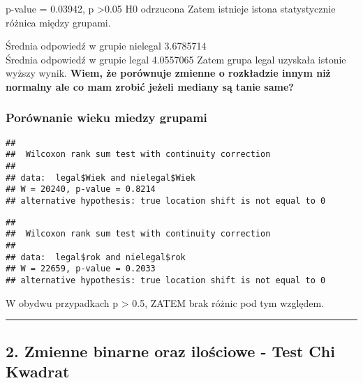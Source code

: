 \documentclass[]{article}
\newenvironment{Shaded}{\begin{snugshade}}{\end{snugshade}}
\newcommand{\KeywordTok}[1]{\textcolor[rgb]{0.13,0.29,0.53}{\textbf{#1}}}
\newcommand{\OperatorTok}[1]{\textcolor[rgb]{0.81,0.36,0.00}{\textbf{#1}}}
\newcommand{\NormalTok}[1]{#1}
\begin{document}
p-value = 0.03942, p \textgreater{}0.05 H0 odrzucona Zatem istnieje
istona statystycznie różnica między grupami.

Średnia odpowiedź w grupie nielegal 3.6785714\\
Średnia odpowiedź w grupie legal 4.0557065 Zatem grupa legal uzyskała
istonie wyższy wynik. \textbf{Wiem, że porównuje zmienne o rozkładzie
innym niż normalny ale co mam zrobić jeżeli mediany są tanie same?}

\subsubsection{Porównanie wieku miedzy
grupami}\label{porownanie-wieku-miedzy-grupami}

\begin{Shaded}
\end{Shaded}

\begin{verbatim}
## 
##  Wilcoxon rank sum test with continuity correction
## 
## data:  legal$Wiek and nielegal$Wiek
## W = 20240, p-value = 0.8214
## alternative hypothesis: true location shift is not equal to 0
\end{verbatim}

\begin{Shaded}
\end{Shaded}

\begin{verbatim}
## 
##  Wilcoxon rank sum test with continuity correction
## 
## data:  legal$rok and nielegal$rok
## W = 22659, p-value = 0.2033
## alternative hypothesis: true location shift is not equal to 0
\end{verbatim}

W obydwu przypadkach p \textgreater{} 0.5, ZATEM brak różnic pod tym
względem.

\begin{center}\rule{0.5\linewidth}{\linethickness}\end{center}

\subsection{2. Zmienne binarne oraz ilościowe - Test Chi
Kwadrat}\label{zmienne-binarne-oraz-ilosciowe---test-chi-kwadrat}
\end{document}
